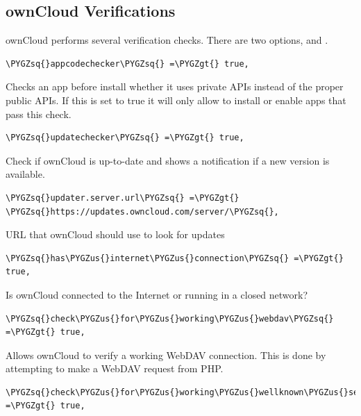 \documentclass[letterpaper,10pt,english]{sphinxmanual}
\def\PYGZus{\char`\_}
\def\PYGZgt{\char`\>}
\def\PYGZsq{\char`\'}
\begin{document}
\subsection{ownCloud Verifications}
\label{configuration_server/config_sample_php_parameters:owncloud-verifications}
ownCloud performs several verification checks. There are two options,
 and .

\begin{Verbatim}[commandchars=\\\{\}]
\PYGZsq{}appcodechecker\PYGZsq{} =\PYGZgt{} true,
\end{Verbatim}

Checks an app before install whether it uses private APIs instead of the
proper public APIs. If this is set to true it will only allow to install or
enable apps that pass this check.

\begin{Verbatim}[commandchars=\\\{\}]
\PYGZsq{}updatechecker\PYGZsq{} =\PYGZgt{} true,
\end{Verbatim}

Check if ownCloud is up-to-date and shows a notification if a new version is
available.

\begin{Verbatim}[commandchars=\\\{\}]
\PYGZsq{}updater.server.url\PYGZsq{} =\PYGZgt{} \PYGZsq{}https://updates.owncloud.com/server/\PYGZsq{},
\end{Verbatim}

URL that ownCloud should use to look for updates

\begin{Verbatim}[commandchars=\\\{\}]
\PYGZsq{}has\PYGZus{}internet\PYGZus{}connection\PYGZsq{} =\PYGZgt{} true,
\end{Verbatim}

Is ownCloud connected to the Internet or running in a closed network?

\begin{Verbatim}[commandchars=\\\{\}]
\PYGZsq{}check\PYGZus{}for\PYGZus{}working\PYGZus{}webdav\PYGZsq{} =\PYGZgt{} true,
\end{Verbatim}

Allows ownCloud to verify a working WebDAV connection. This is done by
attempting to make a WebDAV request from PHP.

\begin{Verbatim}[commandchars=\\\{\}]
\PYGZsq{}check\PYGZus{}for\PYGZus{}working\PYGZus{}wellknown\PYGZus{}setup\PYGZsq{} =\PYGZgt{} true,
\end{Verbatim}
\end{document}
